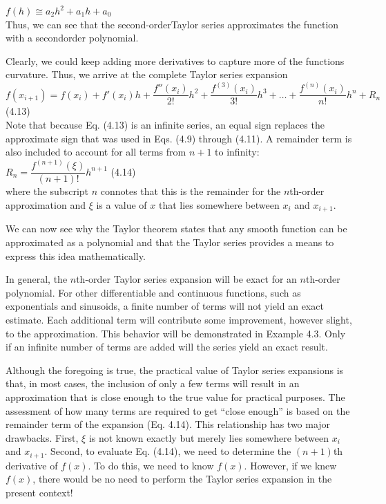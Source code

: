 \documentclass[../main.tex]{subfiles}
\begin{document}
$f(h)\cong a_2h^2+a_1h+a_0$\\

\noindent
Thus, we can see that the second-orderTaylor series approximates the function with a secondorder
polynomial.

Clearly, we could keep adding more derivatives to capture more of the functions curvature.
Thus, we arrive at the complete Taylor series expansion\\

$f(x_{i+1})=f(x_i) + f'(x_i)h + \dfrac{f''(x_i)}{2!}h^2 + \dfrac{f^{(3)}(x_i)}{3!}h^3 +
\hdots + \dfrac{f^{(n)}(x_i)}{n!}h^n + R_n$
\hfill
(4.13)\\

\noindent
Note that because Eq. (4.13) is an infinite series, an equal sign replaces the approximate
sign that was used in Eqs. (4.9) through (4.11). A remainder term is also included to
account for all terms from $n + 1$ to infinity:\\

$R_n = \dfrac{f^{(n+1)}(\xi)}{(n+1)!}h^{n+1}$
\hfill
(4.14)\\

\noindent
where the subscript $n$ connotes that this is the remainder for the $n$th-order approximation
and $\xi$ is a value of $x$ that lies somewhere between $x_i$ and $x_{i+1}$.

We can now see why the Taylor theorem states that any smooth function can be approximated
as a polynomial and that the Taylor series provides a means to express this idea
mathematically.

In general, the $n$th-order Taylor series expansion will be exact for an $n$th-order polynomial.
For other differentiable and continuous functions, such as exponentials and sinusoids,
a finite number of terms will not yield an exact estimate. Each additional term will
contribute some improvement, however slight, to the approximation. This behavior will be
demonstrated in Example 4.3. Only if an infinite number of terms are added will the series
yield an exact result.

Although the foregoing is true, the practical value of Taylor series expansions is that,
in most cases, the inclusion of only a few terms will result in an approximation that is close
enough to the true value for practical purposes. The assessment of how many terms are
required to get ``close enough'' is based on the remainder term of the expansion (Eq. 4.14).
This relationship has two major drawbacks. First, $\xi$ is not known exactly but merely lies
somewhere between $x_i$ and $x_{i+1}$. Second, to evaluate Eq. (4.14), we need to determine the
$(n + 1)$th derivative of $f (x)$. To do this, we need to know $f (x)$. However, if we knew
$f (x)$, there would be no need to perform the Taylor series expansion in the present
context!
\end{document}
